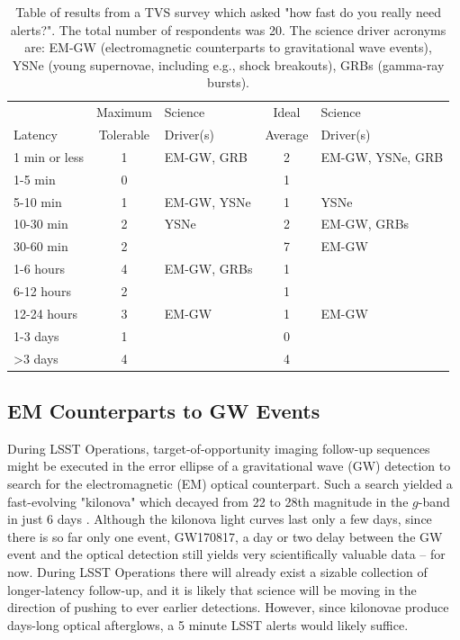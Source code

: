 \documentclass[DM,lsstdraft,authoryear,toc]{lsstdoc}
\begin{document}
\begin{table}[h]%
\caption{Table of results from a TVS survey which asked "how fast do you really need alerts?". The total number of respondents was 20. The science driver acronyms are: EM-GW (electromagnetic counterparts to gravitational wave events), YSNe (young supernovae, including e.g., shock breakouts), GRBs (gamma-ray bursts). \label{tab:tvs}}
\begin{center}
\begin{tabular}{|l|cl|cl|}
\hline
             & Maximum & Science & Ideal       & Science \\
Latency & Tolerable  & Driver(s) &  Average & Driver(s) \\
\hline
1 min or less & 1 & EM-GW, GRB  & 2 & EM-GW, YSNe, GRB \\
1-5 min         & 0 &                          & 1 &                                   \\
5-10 min       & 1 & EM-GW, YSNe & 1 & YSNe \\
10-30 min     & 2 & YSNe               & 2 & EM-GW, GRBs \\
30-60 min     & 2 &                          & 7 & EM-GW  \\
1-6 hours     & 4 & EM-GW, GRBs & 1 &  \\
6-12 hours   & 2 &                          & 1 &  \\
12-24 hours & 3 & EM-GW            & 1 & EM-GW \\
1-3 days      & 1 &                           & 0 &  \\
>3 days       & 4 &                           & 4 &  \\
\hline
\end{tabular}
\end{center}
\label{default}
\end{table}%


\subsection{EM Counterparts to GW Events}\label{ssec:latency_emgw}

During LSST Operations, target-of-opportunity imaging follow-up sequences might be executed in the error ellipse of a gravitational wave (GW) detection to search for the electromagnetic (EM) optical counterpart. Such a search yielded a fast-evolving "kilonova" which decayed from 22 to 28th magnitude in the $g$-band in just 6 days \citep[faster in the bluer and slower in the redder filters][]{2017Sci...358.1559K}. Although the kilonova light curves last only a few days, since there is so far only one event, GW170817, a day or two delay between the GW event and the optical detection still yields very scientifically valuable data -- for now. During LSST Operations there will already exist a sizable collection of longer-latency follow-up, and it is likely that science will be moving in the direction of pushing to ever earlier detections. However, since kilonovae produce days-long optical afterglows, a 5 minute LSST alerts would likely suffice.
\end{document}
